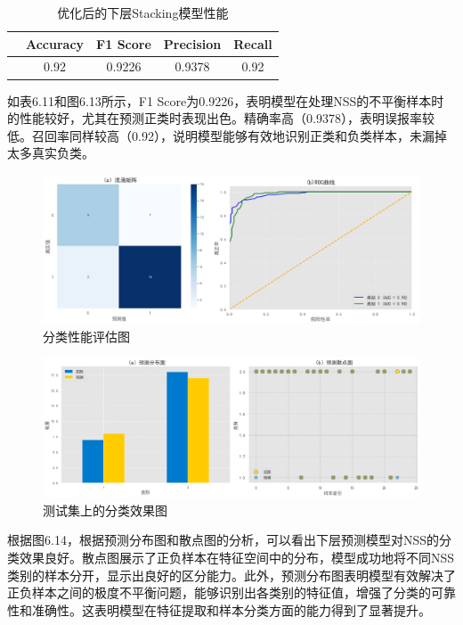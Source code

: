 \documentclass[bwprint]{gmcmthesis}
\begin{document}
\begin{table}[H]
	\centering
	\caption{优化后的下层Stacking模型性能}
	\begin{tabular}{lcccc}
		\toprule
		& Accuracy & F1 Score & Precision & Recall \\
		\midrule
		& 0.92 & 0.9226 & 0.9378 & 0.92 \\
		\bottomrule
	\end{tabular}
\end{table}

如表6.11和图6.13所示，F1 Score为0.9226，表明模型在处理NSS的不平衡样本时的性能较好，尤其在预测正类时表现出色。精确率高（0.9378），表明误报率较低。召回率同样较高（0.92），说明模型能够有效地识别正类和负类样本，未漏掉太多真实负类。


\begin{figure}[H]
	\centering
	\includegraphics[width=1\linewidth]{figures/问题24}
	\caption{分类性能评估图}
	\label{fig:24}
\end{figure}


\begin{figure}[H]
	\centering
	\includegraphics[width=1\linewidth]{figures/问题25}
	\caption{测试集上的分类效果图}
	\label{fig:23}
\end{figure}

根据图6.14，根据预测分布图和散点图的分析，可以看出下层预测模型对NSS的分类效果良好。散点图展示了正负样本在特征空间中的分布，模型成功地将不同NSS类别的样本分开，显示出良好的区分能力。此外，预测分布图表明模型有效解决了正负样本之间的极度不平衡问题，能够识别出各类别的特征值，增强了分类的可靠性和准确性。这表明模型在特征提取和样本分类方面的能力得到了显著提升。
\end{document}
